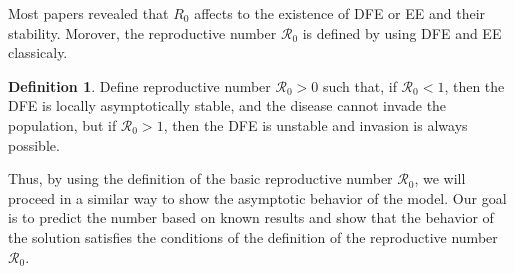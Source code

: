 \documentclass[11pt]{amsart}
\numberwithin{equation}{section}
\theoremstyle{plain}
\theoremstyle{definition}
\newtheorem{definition}[theorem]{Definition}
\begin{document}
Most papers\cite{Yihong_2010, Allen_2008, Diekmann_2013} revealed that $R_0$ affects to the existence of DFE or EE and their stability. Morover, the reproductive number $\mathcal{R}_0$ is defined by using DFE and EE classicaly.

\begin{definition}
	Define reproductive number $\mathcal{R}_0>0$ such that, if $\mathcal{R}_0<1$, then the DFE is locally asymptotically stable, and the disease cannot invade the population, but if $\mathcal{R}_0>1$, then the DFE is unstable and invasion is always possible.
\end{definition}

Thus, by using the definition of the basic reproductive number $\mathcal R_0$, we will proceed in a similar way to show the asymptotic behavior of the model. Our goal is to predict the number based on known results and show that the behavior of the solution satisfies the conditions of the definition of the reproductive number $\mathcal R_0$.
\end{document}
